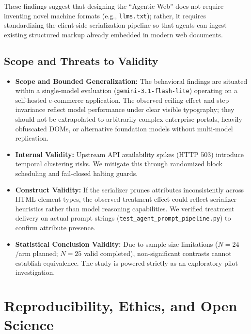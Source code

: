 \documentclass[11pt,a4paper]{article}
\begin{document}
These findings suggest that designing the ``Agentic Web'' does not require inventing novel machine formats (e.g., \texttt{llms.txt}); rather, it requires standardizing the client-side serialization pipeline so that agents can ingest existing structured markup already embedded in modern web documents.

\subsection{Scope and Threats to Validity}
\begin{itemize}
    \item \textbf{Scope and Bounded Generalization:} The behavioral findings are situated within a single-model evaluation (\texttt{gemini-3.1-flash-lite}) operating on a self-hosted e-commerce application. The observed ceiling effect and step invariance reflect model performance under clear visible typography; they should not be extrapolated to arbitrarily complex enterprise portals, heavily obfuscated DOMs, or alternative foundation models without multi-model replication.
    \item \textbf{Internal Validity:} Upstream API availability spikes (HTTP 503) introduce temporal clustering risks. We mitigate this through randomized block scheduling and fail-closed halting guards.
    \item \textbf{Construct Validity:} If the serializer prunes attributes inconsistently across HTML element types, the observed treatment effect could reflect serializer heuristics rather than model reasoning capabilities. We verified treatment delivery on actual prompt strings (\texttt{test\_agent\_prompt\_pipeline.py}) to confirm attribute presence.
    \item \textbf{Statistical Conclusion Validity:} Due to sample size limitations ($N=24$/arm planned; $N=25$ valid completed), non-significant contrasts cannot establish equivalence. The study is powered strictly as an exploratory pilot investigation.
\end{itemize}

\section{Reproducibility, Ethics, and Open Science}
\label{sec:reproducibility}
\end{document}
